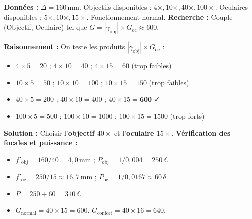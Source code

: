 \documentclass[11pt]{article}
\begin{document}
\begin{exoresolu}[Choix de la configuration pour $G = 600$]
\textbf{Données :} $\Delta = 160\,\text{mm}$. Objectifs disponibles : $4\times, 10\times, 40\times, 100\times$. Oculaires disponibles : $5\times, 10\times, 15\times$. Fonctionnement normal.
\textbf{Recherche :} Couple (Objectif, Oculaire) tel que $G = |\gamma_{\text{obj}}| \times G_{\text{oc}} \approx 600$.

\textbf{Raisonnement :}
On teste les produits $|\gamma_{\text{obj}}| \times G_{\text{oc}}$ :
\begin{itemize}
    \item $4 \times 5 = 20$ ; $4 \times 10 = 40$ ; $4 \times 15 = 60$ (trop faibles)
    \item $10 \times 5 = 50$ ; $10 \times 10 = 100$ ; $10 \times 15 = 150$ (trop faibles)
    \item $40 \times 5 = 200$ ; $40 \times 10 = 400$ ; $40 \times 15 = \mathbf{600}$ ✓
    \item $100 \times 5 = 500$ ; $100 \times 10 = 1000$ ; $100 \times 15 = 1500$ (trop forts)
\end{itemize}

\tcblower

\textbf{Solution :} Choisir l'\textbf{objectif $40\times$} et l'\textbf{oculaire $15\times$}.
\textbf{Vérification des focales et puissance :}
\begin{itemize}
    \item $f'_{\text{obj}} = 160/40 = 4,0\,\text{mm}$ ; $P_{\text{obj}} = 1/0,004 = 250\,\delta$.
    \item $f'_{\text{oc}} = 250/15 \approx 16,7\,\text{mm}$ ; $P_{\text{oc}} = 1/0,0167 \approx 60\,\delta$.
    \item $P = 250 + 60 = 310\,\delta$.
    \item $G_{\text{normal}} = 40 \times 15 = 600$. $G_{\text{confort}} = 40 \times 16 = 640$.
\end{itemize}
\end{exoresolu}
\end{document}
